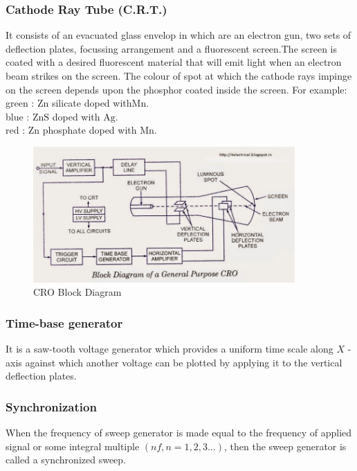 \documentclass{article}
\begin{document}
\subsubsection{Cathode Ray Tube (C.R.T.)}
It consists of an evacuated glass envelop in which are an electron gun, two sets of deflection plates, focussing arrangement and a fluorescent screen.The screen is coated with a desired fluorescent material that will emit light when an electron beam strikes on the screen. The colour of spot at which the cathode rays impinge on the screen depends upon the phosphor coated inside the screen.
For example:
\newline
green : $\mathrm{Zn}$ silicate doped with$\mathrm{Mn}$. \\
blue : $\mathrm{ZnS}$ doped with $\mathrm{Ag}$. \\
red : Zn phosphate doped with Mn.
\begin{figure}[h]
    \centering
    \includegraphics[width = 10cm]{CRO-Block-Diagram.jpg}
    \caption{CRO Block Diagram \cite{CRO}}
\end{figure}
\subsubsection{Time-base generator}
It is a saw-tooth voltage generator which provides a uniform time scale along $X$ -axis against which another voltage can be plotted by applying it to the vertical deflection plates.
\subsubsection{Synchronization}
When the frequency of sweep generator is made equal to the frequency of applied signal or some integral multiple $(n f, n=1,2,3 \ldots)$, then the sweep generator is called a synchronized sweep.
\newpage
\end{document}

